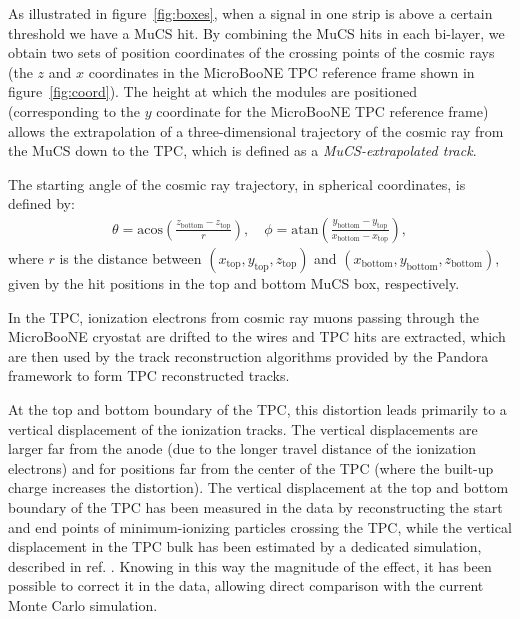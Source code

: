 \documentclass[a4paper,11pt]{article}
\begin{document}
As illustrated in figure~\ref{fig:boxes}, when a signal in one strip is above a certain threshold we have a MuCS hit. By combining the MuCS hits in each bi-layer, we obtain two sets of position coordinates of the crossing points of the cosmic rays (the $z$ and $x$ coordinates in the MicroBooNE TPC reference frame shown in figure~\ref{fig:coord}). The height at which the modules are positioned (corresponding to the $y$ coordinate for the MicroBooNE TPC reference frame) allows the extrapolation of a three-dimensional trajectory of the cosmic ray from the MuCS down to the TPC, which is defined as a \emph{MuCS-extrapolated track}.

The starting angle of the cosmic ray trajectory, in spherical coordinates, is defined by:
\begin{align}\label{eq:angles_mucs}
  \theta = \mathrm{acos}\left(\frac{z_{\mathrm{bottom}}-z_{\mathrm{top}}}{r}\right), \quad
  \phi = \mathrm{atan}\left(\frac{y_{\mathrm{bottom}}-y_{\mathrm{top}}}{x_{\mathrm{bottom}}-x_{\mathrm{top}}}\right),
\end{align}
where $r$ is the distance between $(x_{\mathrm{top}},y_{\mathrm{top}},z_{\mathrm{top}})$ and $(x_{\mathrm{bottom}},y_{\mathrm{bottom}},z_{\mathrm{bottom}})$, given by the hit positions in the top and bottom MuCS box, respectively.

In the TPC, ionization electrons from cosmic ray muons passing through the MicroBooNE cryostat are drifted to the wires and TPC hits are extracted, which are then used by the track reconstruction algorithms provided by the Pandora framework \cite{pandora} to form TPC reconstructed tracks.

At the top and bottom boundary of the TPC, this distortion leads primarily to a vertical displacement of the ionization tracks.  The vertical displacements are larger far from the anode (due to the longer travel distance of the ionization electrons) and for positions far from the center of the TPC (where the built-up charge increases the distortion).  The vertical displacement at the top and bottom boundary of the TPC has been measured in the data by reconstructing the start and end points of minimum-ionizing particles crossing the TPC, while the vertical displacement in the TPC bulk has been estimated by a dedicated simulation, described in ref. \cite{spacecharge}. Knowing in this way the magnitude of the effect, it has been possible to correct it in the data, allowing direct comparison with the current Monte Carlo simulation.
\end{document}
